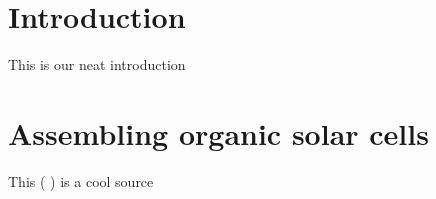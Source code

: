 
\section*{Introduction}%

This is our neat introduction

\section{Assembling organic solar cells}
This (\cite{labdesc} ) is a cool source

